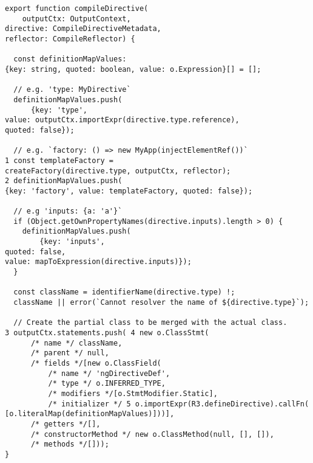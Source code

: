 \begin{verbatim}
export function compileDirective(
    outputCtx: OutputContext,
directive: CompileDirectiveMetadata,
reflector: CompileReflector) {

  const definitionMapValues:
{key: string, quoted: boolean, value: o.Expression}[] = [];

  // e.g. 'type: MyDirective`
  definitionMapValues.push(
      {key: 'type',
value: outputCtx.importExpr(directive.type.reference),
quoted: false});

  // e.g. `factory: () => new MyApp(injectElementRef())`
1 const templateFactory =
createFactory(directive.type, outputCtx, reflector);
2 definitionMapValues.push(
{key: 'factory', value: templateFactory, quoted: false});

  // e.g 'inputs: {a: 'a'}`
  if (Object.getOwnPropertyNames(directive.inputs).length > 0) {
    definitionMapValues.push(
        {key: 'inputs',
quoted: false,
value: mapToExpression(directive.inputs)});
  }

  const className = identifierName(directive.type) !;
  className || error(`Cannot resolver the name of ${directive.type}`);

  // Create the partial class to be merged with the actual class.
3 outputCtx.statements.push( 4 new o.ClassStmt(
      /* name */ className,
      /* parent */ null,
      /* fields */[new o.ClassField(
          /* name */ 'ngDirectiveDef',
          /* type */ o.INFERRED_TYPE,
          /* modifiers */[o.StmtModifier.Static],
          /* initializer */ 5 o.importExpr(R3.defineDirective).callFn(
[o.literalMap(definitionMapValues)]))],
      /* getters */[],
      /* constructorMethod */ new o.ClassMethod(null, [], []),
      /* methods */[]));
}
\end{verbatim}
